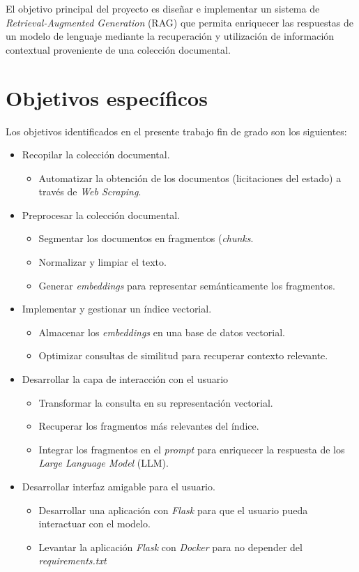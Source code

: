 
El objetivo principal del proyecto es diseñar e implementar un sistema de \textit{Retrieval-Augmented Generation} (RAG) que permita enriquecer las respuestas de un modelo de lenguaje mediante la recuperación y utilización de información contextual proveniente de una colección documental. 

\section{Objetivos específicos}
Los objetivos identificados en el presente trabajo fin de grado son los siguientes:
\begin{itemize}
\tightlist
\item Recopilar la colección documental.
	\begin{itemize}
		\item Automatizar la obtención de los documentos (licitaciones del estado) a través de \textit{Web Scraping}.
	\end{itemize}
\item Preprocesar la colección documental.
	\begin{itemize} 
		\item Segmentar los documentos en fragmentos (\textit{chunks}.
		\item Normalizar y limpiar el texto.
		\item Generar \textit{embeddings} para representar semánticamente los fragmentos.
	\end{itemize}
	\item Implementar y gestionar un índice vectorial.
	\begin{itemize}
		\item Almacenar los \textit{embeddings} en una base de datos vectorial.
		\item Optimizar consultas de similitud para recuperar contexto relevante.
	\end{itemize}
\item Desarrollar la capa de interacción con el usuario
	\begin{itemize}
		\item Transformar la consulta en su representación vectorial.
		\item Recuperar los fragmentos más relevantes del índice.
		\item Integrar los fragmentos en el \textit{prompt} para enriquecer la respuesta de los \textit{Large Language Model} (LLM).
	\end{itemize}
\item Desarrollar interfaz amigable para el usuario.
	\begin{itemize}
		\item Desarrollar una aplicación con \textit{Flask} para que el usuario pueda interactuar con el modelo.
		\item Levantar la aplicación \textit{Flask} con \textit{Docker} para no depender del \textit{requirements.txt}
	\end{itemize}
\end{itemize}

